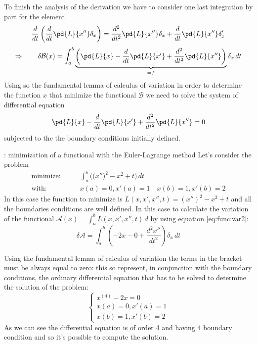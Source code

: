 	To finish the analysis of the derivation we have to consider one last integration by part for the element
	\[ \frac{d}{dt} \left( \frac{d}{dt} \pd{L }{x''} \delta_x \right) = \frac{d^2}{dt^2} \pd{L }{x''} \delta_x + \frac{d}{dt} \pd{L }{x''} \delta_x' \]
	\begin{equation} \label{eq:func:var2}
		\Rightarrow \qquad \delta\mathcal B(x) = \int_a^b \underbrace{\left( \pd{L }{x} - \frac d {dt} \pd{L }{x'} + \frac{d^2}{dt^2} \pd{L }{x''} \right)}_{=f} \delta_x\, dt
	\end{equation}
	Using so the fundamental lemma of calculus of variation in order to determine the function $x$ that minimize the functional $\mathcal B$ we need to solve the system of differential equation
	\[   \pd{L }{x} - \frac d {dt} \pd{L }{x'} + \frac{d^2}{dt^2} \pd{L }{x''} = 0  \]
	subjected to the the boundary conditions initially defined.		
	
	\begin{example}{: minimization of a functional with the Euler-Lagrange  method} \label{es:func:eullagmeth}
		Let's consider the problem 
		\begin{align*}
			\textrm{minimize:}& \qquad \int_a^b \Big( \big(x''\big)^2 - x^2 + t \Big)\,dt \\
			\textrm{with:}& \qquad x(a) = 0, x'(a) = 1 \quad x(b) = 1, x'(b) = 2
		\end{align*}
		In this case the function to minimize is $L (x,x',x'',t) = (x'')^2 - x^2+t$ and all the boundaries conditions are well defined. In this case to calculate the variation of the functional $\mathcal A(x) = \int_a^b L (x,x',x'',t)\, d$ by using equation \ref{eq:func:var2}:
		\[ \delta \mathcal A = \int_a^b \left( -2x - 0 + \frac{d^2x''}{dt^2} \right) \delta_x\, dt \]
		
		Using the fundamental lemma of calculus of variation the terms in the bracket must be always equal to zero: this so represent, in conjunction with the boundary conditions, the ordinary differential equation that has to be solved to determine the solution of the problem:
		\[ \begin{cases}
			x^{(4)} - 2x = 0 \\
			x(a) = 0, x'(a) = 1 \\ x(b) = 1, x'(b) = 2
		\end{cases} \]	
		As we can see the differential equation is of order 4 and having 4 boundary condition and so it's possible to compute the solution.
	\end{example}
	
